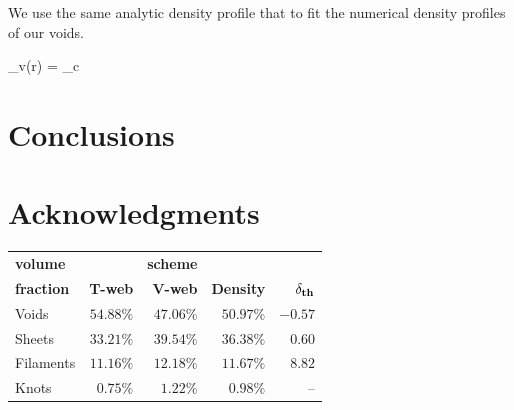 \documentclass[a4,useAMS,usenatbib,usegraphicx]{latex/mn2e}
\begin{document}
We use the same analytic density profile that \SRKED{[Hamaous, et.al 2014]} 
to fit the numerical density profiles of our voids.


{
\delta_v(r) = \delta_c
}



\section{Conclusions}
\label{sec:conclusions}


\section*{Acknowledgments}  





\begin{table}[h]
\begin{flushleft}
\begin{center}
  \begin{tabular}{l  r  r  r r} \hline\hline
	\textbf{volume}					&				&\textbf{scheme}& \\
	\textbf{fraction}				&\textbf{T-web}	&\textbf{V-web}	&	\textbf{Density}  &  $\bf{\delta_{th}}$  \\ \hline
	Voids							&	$54.88\%$	&	$47.06\%$	&	$50.97\%$	&	$ -0.57$			\\ 
	Sheets							&	$33.21\%$	&	$39.54\%$	&	$36.38\%$ 	&	$0.60$				\\
	Filaments						&	$11.16\%$	&	$12.18\%$	&	$11.67\%$ 	&	$8.82$				\\
	Knots							&	$0.75\%$	&	$1.22\%$	&	$0.98\%$  	&	--		\\ \hline\hline
  \end{tabular}  
  
  \label{tab:Samples_Size}
  
\end{center}
\end{flushleft}
\end{table}
\end{document}
